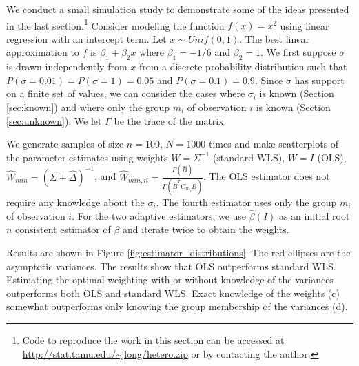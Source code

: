\documentclass[ejs,ps,preprint]{imsart}
\numberwithin{equation}{section}
\theoremstyle{plain}
\begin{document}


We conduct a small simulation study to demonstrate some of the ideas presented in the last section.\footnote{Code to reproduce the work in this section can be accessed at \url{http://stat.tamu.edu/~jlong/hetero.zip} or by contacting the author.} Consider modeling the function $f(x) = x^2$ using linear regression with an intercept term. Let $x \sim Unif(0,1)$. The best linear approximation to $f$ is $\beta_1 + \beta_2x$ where $\beta_1 = -1/6$ and $\beta_2=1$. We first suppose $\sigma$ is drawn independently from $x$ from a discrete probability distribution such that $P(\sigma=0.01) = P(\sigma=1) = 0.05$ and $P(\sigma=0.1)=0.9$. Since $\sigma$ has support on a finite set of values, we can consider the cases where $\sigma_i$ is known (Section \ref{sec:known}) and where only the group $m_i$ of observation $i$ is known (Section \ref{sec:unknown}). We let $\Gamma$ be the trace of the matrix.

We generate samples of size $n=100$, $N=1000$ times and make scatterplots of the parameter estimates using weights $W=\Sigma^{-1}$ (standard WLS), $W=I$ (OLS), $\widehat{W}_{min}=(\Sigma + \widehat{\Delta})^{-1}$, and $\widehat{W}_{min,ii} =  \frac{\Gamma(\widehat{B})}{\Gamma(\widehat{B}^T\widehat{C}_{m_i}\widehat{B})}$. The OLS estimator does not require any knowledge about the $\sigma_i$. The fourth estimator uses only the group $m_i$ of observation $i$. For the two adaptive estimators, we use $\widehat{\beta}(I)$ as an initial root $n$ consistent estimator of $\beta$ and iterate twice to obtain the weights.

Results are shown in Figure \ref{fig:estimator_distributions}. The red ellipses are the asymptotic variances. The results show that OLS outperforms standard WLS. Estimating the optimal weighting with or without knowledge of the variances outperforms both OLS and standard WLS. Exact knowledge of the weights (c) somewhat outperforms only knowing the group membership of the variances (d).
\end{document}
